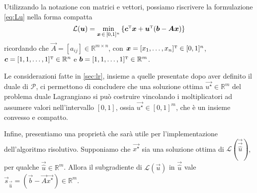 Utilizzando la notazione con matrici e vettori, possiamo riscrivere la formulazione \eqref{eq:Lu} nella forma compatta
\begin{equation}
    \mathcal{L}(\bm{u}) = \min_{\bm{x} \,\in\,[0, 1]^n}\, \{\bm{c}^{\scriptscriptstyle\mathrm{T}}\bm{x} + \bm{u}^{\scriptscriptstyle\mathrm{T}}(\bm{b}-\bm{A}\bm{x})\}
\end{equation}
ricordando che \( \vec{A} = [a_{ij}] \in \mathbb{R}^{m\times n}\), con \( \bm{x} = [x_1, \ldots, x_n]^{\scriptscriptstyle\mathrm{T}} \in
[0, 1]^n \), \( \bm{c} = [1, 1, \ldots, 1]^{\scriptscriptstyle\mathrm{T}} \in \mathbb{R}^n \) e \( \bm{b} = [1, 1, \ldots, 1]^{\scriptscriptstyle\mathrm{T}} \in
\mathbb{R}^m \).

Le considerazioni fatte in \ref{sec:lr}, insieme a quelle presentate dopo aver definito il duale di \( \mathcal{P} \),
ci permettono di concludere che una soluzione ottima \( \vec{u^{\star}} \in \mathbb{R}^m \) del problema duale
Lagrangiano si può costruire vincolando i moltiplicatori ad assumere valori nell'intervallo \( [0, 1] \), ossia  \(
\vec{u^{\star}} \in [0, 1]^m\), che è un insieme convesso e compatto.

Infine, presentiamo una proprietà che sarà utile per l'implementazione dell'algoritmo risolutivo. Supponiamo che \(
\vec{x^{\star}} \) sia una soluzione ottima di \( \mathcal{L}(\vec{\vec{\hat{u}}}) \), per qualche \( \vec{\hat{u}} \in
\mathbb{R}^m \). Allora il subgradiente di \( \mathcal{L}(\vec{u}) \) in \( \vec{\hat{u}} \) vale \(
\vec{s}_{\vec{\hat{u}}} = (\vec{b} - \vec{A}\vec{x^{\star}}) \in \mathbb{R}^m \).

